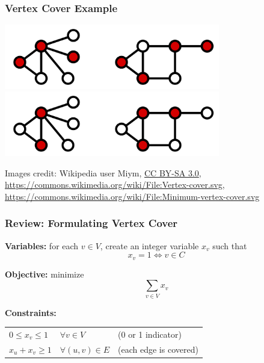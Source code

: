 \documentclass{beamer}
\begin{document}
\begin{frame} \frametitle{Vertex Cover Example}
  \begin{center}
    \includegraphics[height=80pt]{13-vertex-cover-1.png}
    \includegraphics[height=80pt]{13-vertex-cover-2.png}
  \end{center}

  {\tiny
  Images credit: Wikipedia user Miym,
  \href{https://creativecommons.org/licenses/by-sa/3.0)}{CC BY-SA 3.0},
  \url{https://commons.wikimedia.org/wiki/File:Vertex-cover.svg},
  \url{https://commons.wikimedia.org/wiki/File:Minimum-vertex-cover.svg}
  }
\end{frame}

\begin{frame} \frametitle{Review: Formulating Vertex Cover}
  \textbf{Variables:} for each $v \in V$, create an integer variable $x_v$ such that
  \[ x_v = 1 \Leftrightarrow v \in C \]
  
  \textbf{Objective:} minimize
  \[ \sum_{v \in V} x_v \]
  
  \textbf{Constraints:}
  \begin{tabular}{lll}
    $0 \leq x_v \leq 1$ & $\forall v \in V$ & (0 or 1 indicator) \\
    $x_u + x_v \geq 1$ & $\forall (u, v) \in E$ & (each edge is covered)
  \end{tabular}
  
\end{frame}
\end{document}
